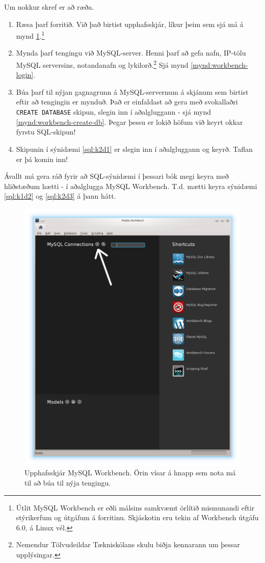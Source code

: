 Um nokkur skref er að ræða.
\begin{enumerate}
 \item Ræsa þarf forritið. Við það birtist upphafsskjár, líkur þeim sem sjá má á mynd \ref{mynd:workbench-upphafsskjar}.\footnote{Útlit MySQL Workbench er eðli málsins samkvæmt örlítið mismunandi eftir stýrikerfum og útgáfum á forritinu. Skjáskotin eru tekin af Workbench útgáfu 6.0, á Linux vél.}
 \item Mynda þarf tengingu við MySQL-server. Henni þarf að gefa nafn, IP-tölu MySQL serversins, notandanafn og lykilorð.\footnote{Nemendur Tölvudeildar Tækniskólans skulu biðja kennarann um þessar upplýsingar.} Sjá mynd \ref{mynd:workbench-login}.
 \item Búa þarf til nýjan gagnagrunn á MySQL-servernum á skjánum sem birtist eftir að tengingin er mynduð. Það er einfaldast að gera með svokallaðri \verb|CREATE DATABASE| skipun, slegin inn í aðalgluggann - sjá mynd \ref{mynd:workbench-create-db}. Þegar þessu er lokið höfum við keyrt okkar fyrstu SQL-skipun!
 \item Skipunin í sýnidæmi \ref{sql:k2d1} er slegin inn í aðalgluggann og keyrð. Taflan er þá komin inn!
\end{enumerate}
Ávallt má gera ráð fyrir að SQL-sýnidæmi í þessari bók megi keyra með hliðstæðum hætti - í aðalglugga MySQL Workbench. T.d. mætti keyra sýnidæmi \ref{sql:k1d2} og \ref{sql:k2d3} á þann hátt.

\begin{figure}
\caption[Upphafsskjár MySQL Workbench]{Upphafsskjár MySQL Workbench. Örin vísar á hnapp sem nota má til að búa til nýja tengingu.}
\label{mynd:workbench-upphafsskjar}
\centering
\includegraphics[width=\linewidth]{myndir/workbench-upphafsskjar-or}
\end{figure}

